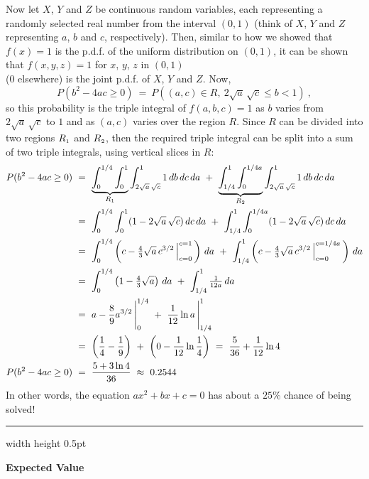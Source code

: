 \begin{exmp}
 Now let $X$, $Y$ and $Z$ be continuous random variables, each representing a randomly selected real number from the
 interval $(0,1)$ (think of $X$, $Y$ and $Z$ representing $a$, $b$ and $c$, respectively).
 Then, similar to how we showed that $f(x)=1$ is the p.d.f. of the uniform distribution on $(0,1)$, it can be shown
 that $f(x,y,z)=1$ for $x$, $y$, $z$ in $(0,1)$\\($0$ elsewhere) is the joint p.d.f. of $X$, $Y$ and $Z$.
 Now,
 \begin{displaymath}
  P(b^2 - 4ac \ge 0) ~=~ P((a,c) \in R,~2\sqrt{a}\,\sqrt{c} \le b < 1)~,
 \end{displaymath}
 so this probability is the triple integral of $f(a,b,c) = 1$ as $b$ varies from $2\sqrt{a}\,\sqrt{c}$ to $1$ and as
 $(a,c)$ varies over the region $R$. Since $R$ can be divided into two regions $R_{\scriptscriptstyle 1}$ and $R_{\scriptscriptstyle 2}$, then
 the required triple integral can be split into a sum of two triple integrals, using vertical slices in $R$:
 \begin{align*}
  P(b^2 - 4ac \ge 0) ~&=~
  \underbrace{\int_0^{1/4} \int_0^1}_{R_{\scriptscriptstyle 1}} \int_{2\sqrt{a}\,\sqrt{c}}^1 1\,db\,dc\,da ~+~
  \underbrace{\int_{1/4}^1 \int_0^{1/4a}}_{R_{\scriptscriptstyle 2}} \int_{2\sqrt{a}\,\sqrt{c}}^1 1\,db\,dc\,da\\
  &=~ \int_0^{1/4} \int_0^1 (1-2\sqrt{a}\,\sqrt{c})\,dc\,da ~+~
   \int_{1/4}^1 \int_0^{1/4a} (1-2\sqrt{a}\,\sqrt{c})\,dc\,da\\
  &=~ \int_0^{1/4} \left( c - \tfrac{4}{3}\sqrt{a}\,c^{3/2} \,\Big|_{c=0}^{c=1} \,\right)\,da ~+~
   \int_{1/4}^1 \left( c - \tfrac{4}{3}\sqrt{a}\,c^{3/2} \,\Big|_{c=0}^{c=1/4a} \,\right)\,da\\
  &=~ \int_0^{1/4} \left( 1 - \tfrac{4}{3}\sqrt{a} \right)\,da ~+~
   \int_{1/4}^1 \tfrac{1}{12a}\,da\\
  &=~ a - \frac{8}{9}a^{3/2}\,\Bigg|_0^{1/4} ~+~ \frac{1}{12}\ln a \,\Bigg|_{1/4}^1\\
  &=~ \left( \frac{1}{4} - \frac{1}{9} \right) ~+~ \left( 0 - \frac{1}{12}\ln \frac{1}{4} \right) ~=~
  \frac{5}{36} + \frac{1}{12}\ln 4\\
  P(b^2 - 4ac \ge 0) ~&=~ \frac{5+3\ln 4}{36} ~\approx~ 0.2544
 \end{align*}
 In other words, the equation $ax^2 + bx + c = 0$ has about a $25$\% chance of being solved!
\end{exmp}
\hrule width \textwidth height 0.5pt
\vspace{3mm}

\par\noindent\textbf{\large{Expected Value}}\normalsize\vspace{2mm}

